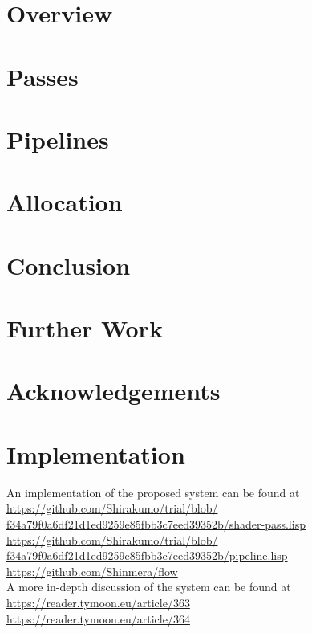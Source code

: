 \documentclass[format=sigconf]{acmart}
\begin{document}
\section{Overview}\label{overview}

\section{Passes}\label{passes}

\section{Pipelines}\label{pipelines}

\section{Allocation}\label{allocation}

\section{Conclusion}\label{conclusion}


\section{Further Work}\label{furtherwork}


\section{Acknowledgements}\label{acknowledgements}


\section{Implementation}\label{implementation}
An implementation of the proposed system can be found at
\\\href{https://github.com/Shirakumo/trial/blob/f34a79f0a6df21d1ed9259e85fbb3c7eed39352b/shader-pass.lisp}{https://github.com/Shirakumo/trial/blob/\\f34a79f0a6df21d1ed9259e85fbb3c7eed39352b/shader-pass.lisp}
\\\href{https://github.com/Shirakumo/trial/blob/f34a79f0a6df21d1ed9259e85fbb3c7eed39352b/pipeline.lisp}{https://github.com/Shirakumo/trial/blob/\\f34a79f0a6df21d1ed9259e85fbb3c7eed39352b/pipeline.lisp}
\\\url{https://github.com/Shinmera/flow} \\

A more in-depth discussion of the system can be found at
\\\url{https://reader.tymoon.eu/article/363}
\\\url{https://reader.tymoon.eu/article/364}


\end{document}
